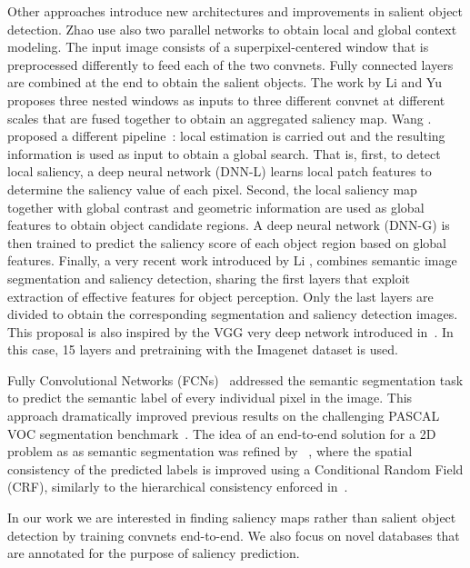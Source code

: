 \documentclass[10pt,twocolumn,letterpaper]{article}
\begin{document}
Other approaches introduce new architectures and improvements in salient object detection. Zhao \etal\cite{zhao2015saliency} use also two parallel networks to obtain local and global context modeling. The input image consists of a superpixel-centered window that is preprocessed differently to feed each of the two convnets. Fully connected layers are combined at the end to obtain the salient objects. The work by Li and Yu~\cite{liu2015visual} proposes three nested windows as inputs to three different convnet at different scales that are fused together to obtain an aggregated saliency map. Wang \etal. proposed a different pipeline~\cite{wang2015deepnetworks}: local estimation is carried out and the resulting information is used as input to obtain a global search. That is, first, to detect local saliency, a deep neural network (DNN-L) learns local patch features to determine the saliency value of each pixel. Second, the local saliency map together with global contrast and geometric information are used as global features to obtain object candidate regions. A deep neural network (DNN-G) is then trained to predict the saliency score of each object region based on global features. Finally, a very recent work introduced by Li \etal\cite{li2015deepsaliency}, combines semantic image segmentation and saliency detection, sharing the first layers that exploit extraction of effective features for object perception. Only the last layers are divided to obtain the corresponding segmentation and saliency detection images. This proposal is also inspired by the VGG very deep network introduced in~\cite{simonyan2015verydeep}. In this case, 15 layers and pretraining with the Imagenet dataset is used. 

Fully Convolutional Networks (FCNs)~\cite{long2015fully} addressed the semantic segmentation task to predict the semantic label of every individual pixel in the image. 
This approach dramatically improved previous results on the challenging PASCAL VOC segmentation benchmark~\cite{everingham2014pascal}.
The idea of an end-to-end solution for a 2D problem as as semantic segmentation was refined by ~\cite{DBLP:journals/corr/ChenPKMY14}, where the spatial consistency of the predicted labels is improved using a Conditional Random Field (CRF), similarly to the hierarchical consistency enforced in~\cite{farabet2013learning}.


In our work we are interested in finding saliency maps rather than salient object detection by training convnets end-to-end. We also focus on novel databases that are annotated for the purpose of saliency prediction.
\end{document}
